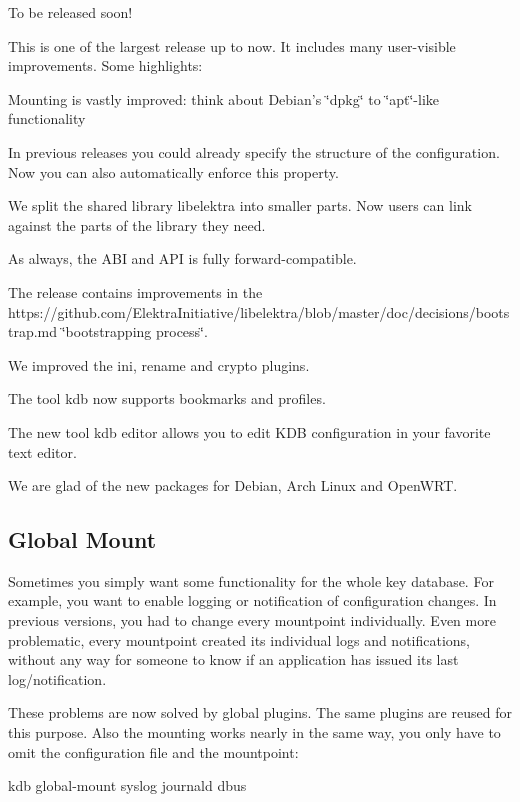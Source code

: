 To be released soon!

This is one of the largest release up to now. It includes many user-\/visible improvements. Some highlights\+:


\begin{DoxyItemize}
\item Mounting is vastly improved\+: think about Debian's \char`\"{}dpkg\char`\"{} to \char`\"{}apt\char`\"{}-\/like functionality
\item In previous releases you could already specify the structure of the configuration. Now you can also automatically enforce this property.
\item We split the shared library {\ttfamily libelektra} into smaller parts. Now users can link against the parts of the library they need.
\item As always, the A\+B\+I and A\+P\+I is fully forward-\/compatible.
\item The release contains improvements in the https\+://github.com/\+Elektra\+Initiative/libelektra/blob/master/doc/decisions/bootstrap.\+md \char`\"{}bootstrapping process\char`\"{}.
\item We improved the {\ttfamily ini}, {\ttfamily rename} and {\ttfamily crypto} plugins.
\item The tool {\ttfamily kdb} now supports bookmarks and profiles.
\item The new tool {\ttfamily kdb editor} allows you to edit K\+D\+B configuration in your favorite text editor.
\item We are glad of the new packages for Debian, Arch Linux and Open\+W\+R\+T.
\end{DoxyItemize}

\subsection*{Global Mount}

Sometimes you simply want some functionality for the whole key database. For example, you want to enable logging or notification of configuration changes. In previous versions, you had to change every mountpoint individually. Even more problematic, every mountpoint created its individual logs and notifications, without any way for someone to know if an application has issued its last log/notification.

These problems are now solved by global plugins. The same plugins are reused for this purpose. Also the mounting works nearly in the same way, you only have to omit the configuration file and the mountpoint\+: \begin{DoxyVerb}    kdb global-mount syslog journald dbus
\end{DoxyVerb}


